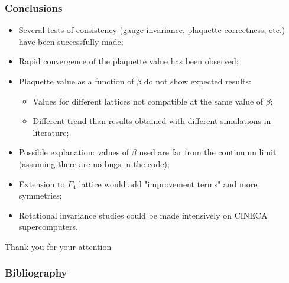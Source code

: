 \documentclass{beamer}
\begin{document}
\begin{frame}
  \frametitle{Conclusions}
  \centering
  \begin{itemize}
    \item<1->[\ding{228}] Several tests of consistency (gauge invariance, plaquette correctness, etc.) have been successfully made;
    \item<2->[\ding{228}] Rapid convergence of the plaquette value has been observed;
    \item<3->[\ding{228}] Plaquette value as a function of $\beta$ do not show expected results:
    \begin{itemize}
      \item<3-> Values for different lattices not compatible at the same value of $\beta$;
      \item<4-> Different trend than results obtained with different simulations in literature\cite{Celmaster:1983vy};
    \end{itemize}
    \item<5->[\ding{228}] Possible explanation: values of $\beta$ used are far from the continuum limit (assuming there are no bugs in the code);
    \vspace{.5\baselineskip}
    \item<6->[\textcolor{green}{\ding{228}}] Extension to $F_4$ lattice would add "improvement terms" and more symmetries;
    \item<7->[\textcolor{green}{\ding{228}}] Rotational invariance studies could be made intensively on CINECA supercomputers.
  \end{itemize}
\end{frame}

\begin{comment}
\begin{frame}
  \frametitle{Work in Progress}
  \begin{columns}
  \column{0.5\textwidth}
\onslide<1->
    \begin{itemize}
    \item Implement the $F_4$ lattice in the simulation program and make efficiency studies;
    \vspace{5\baselineskip}
\onslide<2->
    \item Make a rotational invariance study on the new lattice, hoping to get better results than the Simple Hypercubic lattice.
    \end{itemize}
    
\onslide<1->
  \column{0.1\textwidth}
  \column{0.3\textwidth}
    \texttt{[image: F4\_root\_lattice.png]}\\
    \vspace{\baselineskip}
\onslide<2->
    \texttt{[image: plots/XY\_Plane\_nt6\_ns16\_beta2.35\_copied.png]}
  \end{columns}
\end{frame}
\end{comment}

\begin{frame}
  \centering
  \Huge
  Thank you for your attention
\end{frame}

\begin{frame}[allowframebreaks]
  \frametitle{Bibliography}
  \printbibliography
\end{frame}
\end{document}
